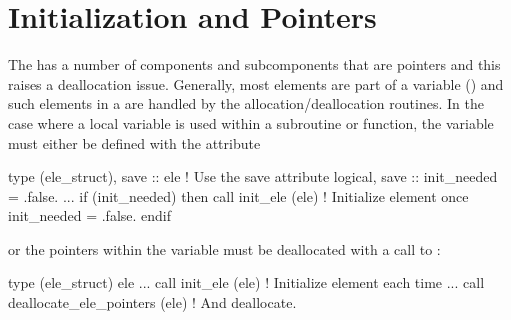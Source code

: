 \section{Initialization and Pointers}

The  has a number of components and subcomponents 
that are pointers and this raises a deallocation issue.
Generally, most  elements are part of a 
variable ()
and such elements in a  are handled by the
 allocation/deallocation routines. 
In the case where a local 
variable is used within a subroutine or function, the  
variable must either be defined with the  attribute 
\begin{example}
  type (ele_struct), save :: ele          ! Use the save attribute
  logical, save :: init_needed = .false.
  ...
  if (init_needed) then
    call init_ele (ele)                ! Initialize element once
    init_needed = .false.
  endif
\end{example}
or the pointers within the variable must be deallocated  with a call to
:
\begin{example}
  type (ele_struct) ele  
  ...
  call init_ele (ele)                ! Initialize element each time
  ...
  call deallocate_ele_pointers (ele) ! And deallocate.
\end{example}

